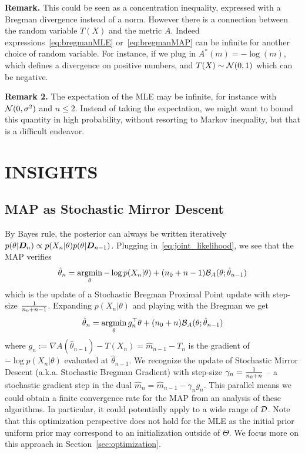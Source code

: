 \documentclass[twoside]{article}
\let\oldsection\section
\renewcommand{\section}[1]{\oldsection{\texorpdfstring{\uppercase{#1}}{#1}}}
\newcommand{\logpart}{A}
\newcommand{\conj}{\logpart^*}
\newcommand{\bregman}{\cB_\logpart}
\newcommand{\nat}{\theta}
\newcommand{\m}{m}
\newcommand{\lr}{\gamma} %
\begin{document}
{\bf Remark.}
This could be seen as a concentration inequality, expressed with a Bregman divergence instead of a norm.
However there is a connection between the random variable $T(X)$ and the metric $\logpart$.
Indeed expressions~\eqref{eq:bregmanMLE} or~\eqref{eq:bregmanMAP} can be infinite for another choice of random variable.
For instance, if we plug in $\conj(\m)= -\log(\m)$, which defines a divergence on positive numbers, and $T(X) \sim {\mathcal N}(0,1)$ which can be negative.

{\bf Remark 2.}
The expectation of the MLE may be infinite, for instance with ${\mathcal N}(0,\sigma^2)$ and $n\leq 2$. Instead of taking the expectation,  we might want to bound this quantity in high probability, without resorting to Markov inequality, but that is a difficult endeavor.

\section{Insights}

\subsection{MAP as Stochastic Mirror Descent}
\label{ssec:MAP=SMD}
By Bayes rule, the posterior can always be written iteratively $p(\nat | \mD_n) \propto p(X_n | \nat) p(\nat | \mD_{n-1})$.
Plugging in~\eqref{eq:joint_likelihood}, we see that the MAP verifies
\begin{align*}
	\hat \nat_{n}
	= \argmin_\nat - \log p(X_{n} | \nat) + (n_0 + n -1) \bregman(\nat; \hat \nat_{n-1})
\end{align*}
which is the update of a Stochastic Bregman Proximal Point update with step-size $\frac{1}{n_0 + n - 1}$. Expanding $p(X_{n} | \nat)$ and  playing with the Bregman we get
\begin{align}
		\hat \nat_{n}
	= \argmin_\nat g_{n}^\top \nat + (n_0 + n) \bregman(\nat; \hat \nat_{n-1})
    \label{eq:SMD}
\end{align}
where $g_{n} := \nabla\logpart(\hat \nat_{n-1}) - T(X_n) = \hat \m_{n-1} - T_n$ is the gradient of $-\log p(X_{n} | \nat)$ evaluated at $\hat \nat_{n-1}$.
We recognize the update of Stochastic Mirror Descent (a.k.a. Stochastic Bregman Gradient) with step-size $\lr_n = \inv{n_0 + n}$ -- a stochastic gradient step in the dual $\hat \m_n = \hat \m_{n-1} - \lr_n g_n$.
This parallel means we could obtain a finite convergence rate for the  MAP from an analysis of these algorithms.
In particular, it could potentially apply to a wide range of ${\mathcal D}$.
Note that this optimization perspective does not hold for the MLE %
as the initial prior uniform prior may correspond to an initialization outside of $\Theta$.
We focus more on this approach in Section~\ref{sec:optimization}.
\end{document}
